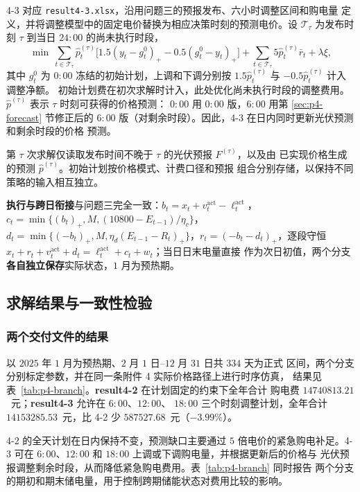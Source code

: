 4-3 对应 \texttt{result4-3.xlsx}，沿用问题三的预报发布、六小时调整区间和购电量
定义，并将调整模型中的固定电价替换为相应决策时刻的预测电价。设 $\mathcal T_\tau$ 为发布时刻
$\tau$ 到当日 $24{:}00$ 的尚未执行时段，
$$
\min\ \sum_{t\in\mathcal T_\tau}\widehat p^{(\tau)}_t
\Big[1.5(y_t-g_t^0)_+-0.5(g_t^0-y_t)_+\Big]
+\sum_{t\in\mathcal T_\tau}5\widehat p^{(\tau)}_t\bar r_t+\lambda\xi ,
$$
其中 $g_t^0$ 为 $0{:}00$ 冻结的初始计划，上调和下调分别按
$1.5\widehat p_t^{(\tau)}$ 与 $-0.5\widehat p_t^{(\tau)}$ 计入调整净额。
初始计划费在初次求解时计入，此处优化尚未执行时段的调整费用。
$\widehat p^{(\tau)}$ 表示 $\tau$ 时刻可获得的价格预测：
$0{:}00$ 用 $0{:}00$ 版，$6{:}00$ 用第 \ref{sec:p4-forecast} 节修正后的
$6{:}00$ 版（对剩余时段）。因此，4-3 在日内同时更新光伏预测和剩余时段的价格
预测。

第 $\tau$ 次求解仅读取发布时间不晚于 $\tau$ 的光伏预报 $F^{(\tau)}$，以及由
已实现价格生成的预测 $\widehat p^{(\tau)}$。初始计划按价格模式、计费口径和预报
组合分别存储，以保持不同策略的输入相互独立。

\textbf{执行与跨日衔接}与问题三完全一致：$b_t=x_t+v_t^{\mathrm{act}}-
\ell_t^{\mathrm{act}}$，$c_t=\min\{(b_t)_+,M,(10800-E_{t-1})/\eta_c\}$，
$d_t=\min\{(-b_t)_+,M,\eta_d(E_{t-1}-R_t)_+\}$，$r_t=(-b_t-d_t)_+$，逐段守恒
$x_t+r_t+v_t^{\mathrm{act}}+d_t=\ell_t^{\mathrm{act}}+c_t+w_t$；当日日末电量直接
作为次日初值，两个分支\textbf{各自独立保存}实际状态，$1$ 月为预热期。

\subsection{求解结果与一致性检验}
\label{sec:p4-result}

\subsubsection{两个交付文件的结果}

以 $2025$ 年 $1$ 月为预热期、$2$ 月 $1$ 日--$12$ 月 $31$ 日共 $334$ 天为正式
区间，两个分支分别标定参数，并在同一条附件 4 实际价格路径上进行时序仿真，
结果见表~\ref{tab:p4-branch}。\textbf{result4-2} 在计划固定的约束下全年合计
购电费 $14740813.21$~元；\textbf{result4-3} 允许在 $6{:}00$、$12{:}00$、
$18{:}00$ 三个时刻调整计划，全年合计 $14153285.53$~元，比 4-2 少
$587527.68$~元（$-3.99\%$）。

4-2 的全天计划在日内保持不变，预测缺口主要通过 $5$ 倍电价的紧急购电补足。4-3 可在
$6{:}00$、$12{:}00$ 和 $18{:}00$ 上调或下调购电量，并根据更新后的价格与
光伏预报调整剩余时段，从而降低紧急购电费用。表~\ref{tab:p4-branch} 同时报告
两个分支的期初和期末储电量，用于控制跨期储能状态对费用比较的影响。

